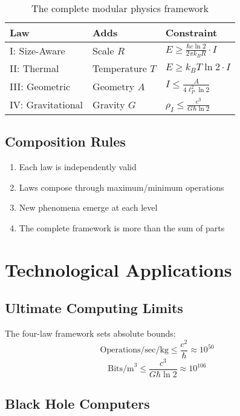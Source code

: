 \documentclass[11pt,a4paper]{article}
\theoremstyle{definition}
\begin{document}
\begin{table}[h]
\centering
\begin{tabular}{|l|l|l|}
\hline
\textbf{Law} & \textbf{Adds} & \textbf{Constraint} \\
\hline
I: Size-Aware & Scale $R$ & $E \geq \frac{\hbar c \ln 2}{2\pi k_B R} \cdot I$ \\
II: Thermal & Temperature $T$ & $E \geq k_B T \ln 2 \cdot I$ \\
III: Geometric & Geometry $A$ & $I \leq \frac{A}{4\ell_P^2 \ln 2}$ \\
IV: Gravitational & Gravity $G$ & $\rho_I \leq \frac{c^3}{G\hbar \ln 2}$ \\
\hline
\end{tabular}
\caption{The complete modular physics framework}
\end{table}

\subsection{Composition Rules}

\begin{enumerate}
\item Each law is independently valid
\item Laws compose through maximum/minimum operations
\item New phenomena emerge at each level
\item The complete framework is more than the sum of parts
\end{enumerate}

\section{Technological Applications}

\subsection{Ultimate Computing Limits}

The four-law framework sets absolute bounds:
\begin{equation}
\text{Operations/sec/kg} \leq \frac{c^2}{\hbar} \approx 10^{50}
\end{equation}
\begin{equation}
\text{Bits/m}^3 \leq \frac{c^3}{G\hbar \ln 2} \approx 10^{106}
\end{equation}

\subsection{Black Hole Computers}
\end{document}
